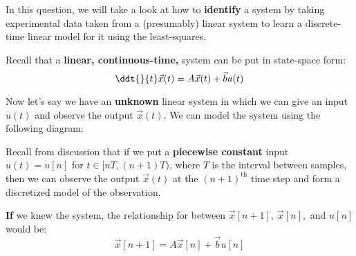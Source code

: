 

In this question, we will take a look at how to \textbf{identify} a system by taking experimental data taken from a (presumably) linear system to learn a discrete-time linear model for it using the least-squares.

Recall that a \textbf{linear, continuous-time,} system can be put in state-space form:
\begin{equation}
\ddt{}{t} \vec{x}(t) = A \vec{x}(t) + \vec{b} u(t)
\end{equation}

Now let's say we have an \textbf{unknown} linear system in which we can give an input $u(t)$ and observe the output $\vec{x}(t).$ We can model the system using the following diagram:
\begin{center}
\end{center}

Recall from discussion that if we put a \textbf{piecewise constant} input $u(t) = u[n]$ for $t \in [nT, (n+1)T)$, where $T$ is the interval between samples, then we can observe the output $\vec{x}(t)$ at the $(n+1)^\text{th}$ time step and form a discretized model of the observation.

\begin{center}
\end{center}

\textbf{If} we knew the system, the relationship for between $\vec{x}[n+1], \ \vec{x}[n], $ and $u[n]$ would be:
\begin{equation}
\vec{x}[n + 1] = A \vec{x}[n] + \vec{b} u[n]
\end{equation}

